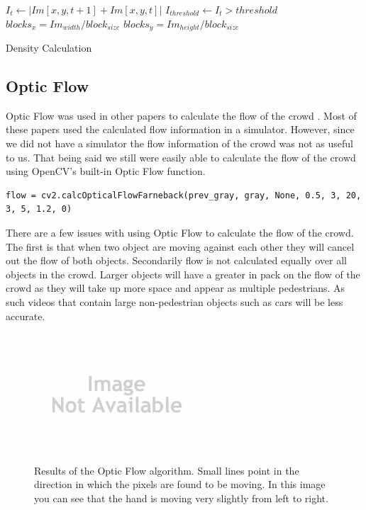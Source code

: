 \documentclass[12pt, twocolumn, conference]{IEEEtran}
\begin{document}
\begin{algorithm}
\DontPrintSemicolon
 $I_{t} \leftarrow | Im[x, y, t+1] + Im[x, y, t] | $\;
 $I_{threshold} \leftarrow I_{t} > threshold$\;
 $blocks_{x} = Im_{width}/block_{size}$\;
 $blocks_{y} = Im_{height}/block_{size}$\;
\caption{Density Calculation}
\end{algorithm}

\subsection{Optic Flow}

Optic Flow was used in other papers to calculate the flow of the crowd \cite{N. Courty}\cite{B. Boghossian}\cite{R. Mehran}. Most of these papers used the calculated flow information in a simulator. However, since we did not have a simulator the flow information of the crowd was not as useful to us. That being said we still were easily able to calculate the flow of the crowd using OpenCV’s built-in Optic Flow function.

\begin{lstlisting}
flow = cv2.calcOpticalFlowFarneback(prev_gray, gray, None, 0.5, 3, 20, 3, 5, 1.2, 0)
\end{lstlisting}

There are a few issues with using Optic Flow to calculate the flow of the crowd. The first is that when two object are moving against each other they will cancel out the flow of both objects. Secondarily flow is not calculated equally over all objects in the crowd. Larger objects will have a greater in pack on the flow of the crowd as they will take up more space and appear as multiple pedestrians. As such videos that contain large non-pedestrian objects such as cars will be less accurate.

\begin{figure}[!t]
\centering
\includegraphics[width=2.5in]{noImage.jpg}
\caption{Results of the Optic Flow algorithm. Small lines point in the direction in which the pixels are found to be moving. In this image you can see that the hand is moving very slightly from left to right.}
\label{Optic_Flow}
\end{figure}
\end{document}
